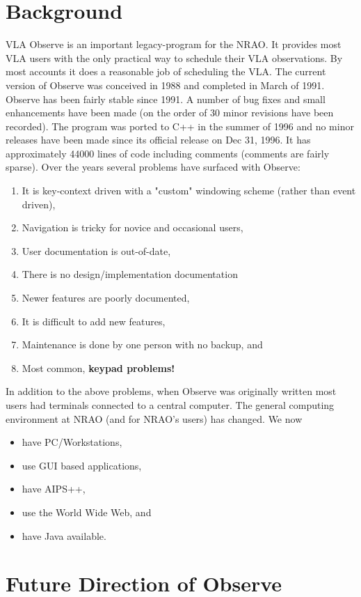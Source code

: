 
\section{Background}
VLA Observe is an important legacy-program for the NRAO.  It provides most VLA
users with the only practical way to schedule their VLA observations.  By most 
accounts it does a reasonable job of scheduling the VLA.  
The current version of Observe was conceived in 1988 and completed in March of
1991. Observe has been fairly stable since 1991.  A number of bug fixes and
small enhancements have been made (on the order of 30 minor revisions have been
recorded).  The program was ported to C++ in the summer of 1996 and no
minor releases have been made since its official release on Dec 31, 1996.
It has approximately 44000 lines of code
including comments (comments are fairly sparse).  Over the years several
problems have surfaced with Observe:
\begin{enumerate}
\item It is key-context
driven with a "custom" windowing scheme (rather than event driven),
\item  Navigation is tricky for novice and occasional users,
\item User documentation is out-of-date, 
\item There is no design/implementation documentation
\item Newer features are poorly documented,
\item It is difficult to add new features, 
\item Maintenance is done by one person with no backup, and
\item Most common, \textbf{keypad problems!}
\end{enumerate}
In addition to the above problems, when Observe was
originally written most users had terminals connected to a central computer.
The general computing environment at NRAO (and for NRAO's users) has changed.
We now
\begin{itemize}
\item have PC/Workstations,
\item use GUI based applications,
\item have AIPS++,
\item use the World Wide Web, and
\item have Java available.
\end{itemize}

\section{Future Direction of Observe}
